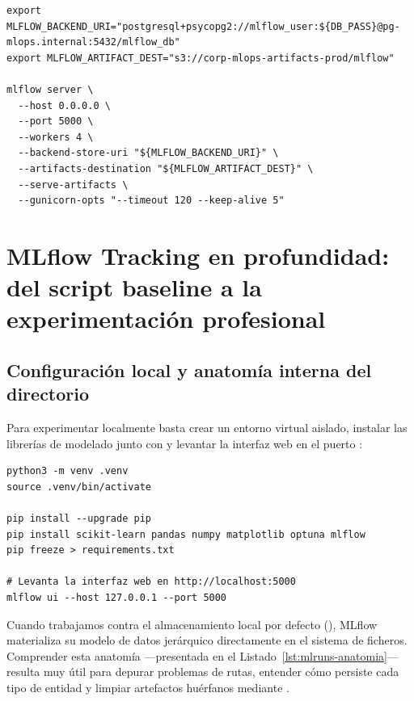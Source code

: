 \begin{lstlisting}[style=bash, caption={Despliegue de un MLflow Tracking Server de producción respaldado por PostgreSQL y almacenamiento S3 en modo proxied artifacts.}, label={lst:mlflow-server-prod}]
export MLFLOW_BACKEND_URI="postgresql+psycopg2://mlflow_user:${DB_PASS}@pg-mlops.internal:5432/mlflow_db"
export MLFLOW_ARTIFACT_DEST="s3://corp-mlops-artifacts-prod/mlflow"

mlflow server \
  --host 0.0.0.0 \
  --port 5000 \
  --workers 4 \
  --backend-store-uri "${MLFLOW_BACKEND_URI}" \
  --artifacts-destination "${MLFLOW_ARTIFACT_DEST}" \
  --serve-artifacts \
  --gunicorn-opts "--timeout 120 --keep-alive 5"
\end{lstlisting}

\section[MLflow Tracking en profundidad]{MLflow Tracking en profundidad: del script baseline a la experimentación profesional}\label{sec:mlflow-tracking}

\subsection{Configuración local y anatomía interna del directorio }

Para experimentar localmente basta crear un entorno virtual aislado, instalar las librerías de modelado junto con  y levantar la interfaz web en el puerto :

\begin{lstlisting}[style=bash, caption={Inicialización de entorno virtual limpio y arranque de la interfaz local de MLflow.}, label={lst:mlflow-setup-local}]
python3 -m venv .venv
source .venv/bin/activate

pip install --upgrade pip
pip install scikit-learn pandas numpy matplotlib optuna mlflow
pip freeze > requirements.txt

# Levanta la interfaz web en http://localhost:5000
mlflow ui --host 127.0.0.1 --port 5000
\end{lstlisting}

Cuando trabajamos contra el almacenamiento local por defecto (), MLflow materializa su modelo de datos jerárquico directamente en el sistema de ficheros. Comprender esta anatomía ---presentada en el Listado~\ref{lst:mlruns-anatomia}--- resulta muy útil para depurar problemas de rutas, entender cómo persiste cada tipo de entidad y limpiar artefactos huérfanos mediante .

